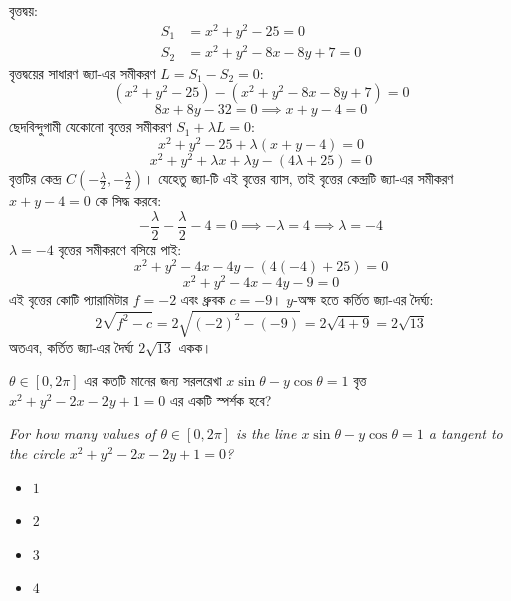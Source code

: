 \documentclass[12pt, a4paper]{article}
\begin{document}
\begin{tcolorbox}[solutionbox={সমাধান (Solution)}]
    \noindent
    বৃত্তদ্বয়:
    \begin{align*}
        S_1 &= x^2 + y^2 - 25 = 0 \\
        S_2 &= x^2 + y^2 - 8x - 8y + 7 = 0
    \end{align*}
    বৃত্তদ্বয়ের সাধারণ জ্যা-এর সমীকরণ $L = S_1 - S_2 = 0$:
    \[ (x^2 + y^2 - 25) - (x^2 + y^2 - 8x - 8y + 7) = 0 \]
    \[ 8x + 8y - 32 = 0 \implies x + y - 4 = 0 \]
    ছেদবিন্দুগামী যেকোনো বৃত্তের সমীকরণ $S_1 + \lambda L = 0$:
    \[ x^2 + y^2 - 25 + \lambda(x + y - 4) = 0 \]
    \[ x^2 + y^2 + \lambda x + \lambda y - (4\lambda + 25) = 0 \]
    বৃত্তটির কেন্দ্র $C\left(-\frac{\lambda}{2}, -\frac{\lambda}{2}\right)$। যেহেতু জ্যা-টি এই বৃত্তের ব্যাস, তাই বৃত্তের কেন্দ্রটি জ্যা-এর সমীকরণ $x + y - 4 = 0$ কে সিদ্ধ করবে:
    \[ -\frac{\lambda}{2} - \frac{\lambda}{2} - 4 = 0 \implies -\lambda = 4 \implies \lambda = -4 \]
    $\lambda = -4$ বৃত্তের সমীকরণে বসিয়ে পাই:
    \[ x^2 + y^2 - 4x - 4y - (4(-4) + 25) = 0 \]
    \[ x^2 + y^2 - 4x - 4y - 9 = 0 \]
    এই বৃত্তের কোটি প্যারামিটার $f = -2$ এবং ধ্রুবক $c = -9$। 
    $y$-অক্ষ হতে কর্তিত জ্যা-এর দৈর্ঘ্য:
    \[ 2\sqrt{f^2 - c} = 2\sqrt{(-2)^2 - (-9)} = 2\sqrt{4 + 9} = 2\sqrt{13} \]
    অতএব, কর্তিত জ্যা-এর দৈর্ঘ্য $2\sqrt{13}$ একক।
\end{tcolorbox}

\begin{tcolorbox}[questionbox={প্রশ্ন (Question) 6}]
    \noindent
    $\theta \in [0, 2\pi]$ এর কতটি মানের জন্য সরলরেখা $x \sin \theta - y \cos \theta = 1$ বৃত্ত $x^2 + y^2 - 2x - 2y + 1 = 0$ এর একটি স্পর্শক হবে?
    
    \vspace{0.8em}
    \begin{english}
    \noindent\textit{\color{darkgray}
    For how many values of $\theta \in [0, 2\pi]$ is the line $x \sin \theta - y \cos \theta = 1$ a tangent to the circle $x^2 + y^2 - 2x - 2y + 1 = 0$?
    }
    \end{english}
\end{tcolorbox}

\begin{itemize}[label={}, leftmargin=1cm, itemsep=0.5em]
    \item[\textbf{A)}] $1$
    \item[\textbf{B)}] $2$
    \item[\textbf{C)}] $3$
    \item[\textbf{D)}] $4$
\end{itemize}
\end{document}
